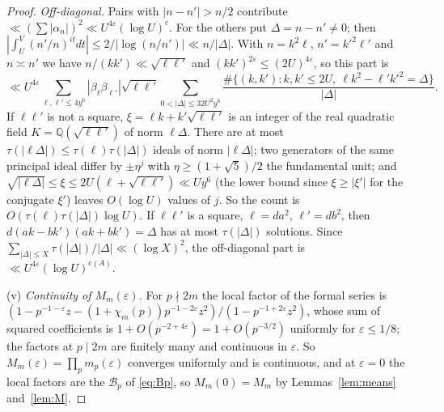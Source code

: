 \documentclass[11pt]{amsart}
\theoremstyle{remark}
\newcommand{\cB}{\mathcal{B}}
\begin{document}
\begin{proof}
\emph{Off-diagonal.} Pairs with $|n-n'|>n/2$ contribute $\ll(\sum|\alpha_n|)^2\ll U^{4\varepsilon}(\log U)^c$. For the others put $\Delta=n-n'\neq0$; then $|\int_U^V(n'/n)^{it}dt|\le2/|\log(n/n')|\ll n/|\Delta|$. With $n=k^2\ell$, $n'=k'^2\ell'$ and $n\asymp n'$ we have $n/(kk')\ll\sqrt{\ell\ell'}$ and $(kk')^{2\varepsilon}\le(2U)^{4\varepsilon}$, so this part is
\[
\ll U^{4\varepsilon}\sum_{\ell,\ell'\le4y^6}|\beta_\ell\beta_{\ell'}|\sqrt{\ell\ell'}\sum_{0<|\Delta|\le32U^2y^6}\frac{\#\{(k,k')\colon k,k'\le2U,\ \ell k^2-\ell'k'^2=\Delta\}}{|\Delta|}.
\]
If $\ell\ell'$ is not a square, $\xi=\ell k+k'\sqrt{\ell\ell'}$ is an integer of the real quadratic field $K=\mathbb Q(\sqrt{\ell\ell'})$ of norm $\ell\Delta$. There are at most $\tau(|\ell\Delta|)\le\tau(\ell)\tau(|\Delta|)$ ideals of norm $|\ell\Delta|$; two generators of the same principal ideal differ by $\pm\eta^j$ with $\eta\ge(1+\sqrt5)/2$ the fundamental unit; and $\sqrt{|\ell\Delta|}\le\xi\le2U(\ell+\sqrt{\ell\ell'})\ll Uy^6$ (the lower bound since $\xi\ge|\xi'|$ for the conjugate $\xi'$) leaves $O(\log U)$ values of $j$. So the count is $O(\tau(\ell)\tau(|\Delta|)\log U)$. If $\ell\ell'$ is a square, $\ell=da^2$, $\ell'=db^2$, then $d(ak-bk')(ak+bk')=\Delta$ has at most $\tau(|\Delta|)$ solutions. Since $\sum_{|\Delta|\le X}\tau(|\Delta|)/|\Delta|\ll(\log X)^2$, the off-diagonal part is $\ll U^{4\varepsilon}(\log U)^{c(A)}$.

(v) \emph{Continuity of $M_m(\varepsilon)$.} For $p\nmid2m$ the local factor of the formal series is $(1-p^{-1-\varepsilon}z-(1+\chi_m(p))p^{-1-2\varepsilon}z^2)/(1-p^{-1+2\varepsilon}z^2)$, whose sum of squared coefficients is $1+O(p^{-2+4\varepsilon})=1+O(p^{-3/2})$ uniformly for $\varepsilon\le1/8$; the factors at $p\mid2m$ are finitely many and continuous in $\varepsilon$. So $M_m(\varepsilon)=\prod_pm_p(\varepsilon)$ converges uniformly and is continuous, and at $\varepsilon=0$ the local factors are the $\cB_p$ of \eqref{eq:Bp}, so $M_m(0)=M_m$ by Lemmas~\ref{lem:means} and~\ref{lem:M}.
\end{proof}
\end{document}
